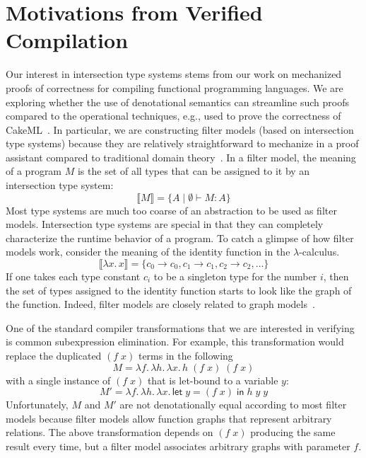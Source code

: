 \documentclass{article}
\begin{document}
\section{Motivations from Verified Compilation}

Our interest in intersection type systems stems from our work on
mechanized proofs of correctness for compiling functional programming
languages. We are exploring whether the use of denotational semantics
can streamline such proofs compared to the operational techniques,
e.g., used to prove the correctness of
CakeML~\citep{Kumar:2014aa,Owens:2017aa}. In particular, we are
constructing filter models (based on intersection type systems)
because they are relatively straightforward to mechanize in a proof
assistant compared to traditional domain
theory~\citep{Benton:2009ab,Dockins:2014aa}.  In a filter model, the
meaning of a program $M$ is the set of all types that can be assigned
to it by an intersection type system:
\[
   \llbracket M \rrbracket = \{ A \mid \emptyset \vdash M : A \}
\]
Most type systems are much too coarse of an abstraction to be used as
filter models. Intersection type systems are special in that they can
completely characterize the runtime behavior of a program.  To catch a
glimpse of how filter models work, consider the meaning of the
identity function in the $\lambda$-calculus.
\[
  \llbracket \lambda x.\, x \rrbracket =
      \{ c_0 \to c_0, c_1 \to c_1, c_2 \to c_2, \ldots \}
\]
If one takes each type constant $c_i$ to be a singleton type for the
number $i$, then the set of types assigned to the identity function
starts to look like the graph of the function. Indeed, filter models
are closely related to graph
models~\citep{Scott:1976lq,Engeler:1981aa,Plotkin:1993ab}.

One of the standard compiler transformations that we are interested in
verifying is common subexpression elimination. For example, this
transformation would replace the duplicated $(f \; x)$ terms in the
following
\[
  M = \lambda f.\, \lambda h.\, \lambda x.\, h \; (f \; x) \; (f \; x)
\]
with a single instance of $(f\;x)$ that is let-bound to a variable $y$:
\[
M' = \lambda f.\, \lambda h.\, \lambda x.\,
\mathsf{let}\; y = (f \; x) \;\mathsf{in}\;
h \; y \; y
\]
Unfortunately, $M$ and $M'$ are not denotationally equal according to
most filter models because filter models allow function graphs that
represent arbitrary relations. The above transformation depends on $(f
\; x)$ producing the same result every time, but a filter model
associates arbitrary graphs with parameter $f$.
\end{document}
